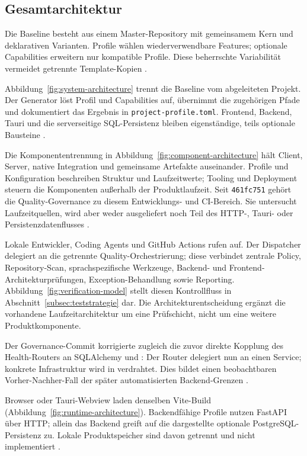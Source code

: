 \subsection{Gesamtarchitektur}
\label{subsec:gesamtarchitektur}

Die Baseline besteht aus einem Master-Repository mit gemeinsamem Kern und
deklarativen Varianten. Profile wählen wiederverwendbare Features; optionale
Capabilities erweitern nur kompatible Profile. Diese beherrschte Variabilität
vermeidet getrennte Template-Kopien
\parencite{clements2001software-product-lines,kleiveist2026profiles}.



Abbildung~\ref{fig:system-architecture} trennt die Baseline vom abgeleiteten
Projekt. Der Generator löst Profil und Capabilities auf, übernimmt die
zugehörigen Pfade und dokumentiert das Ergebnis in
\texttt{project-profile.toml}. Frontend, Backend, Tauri und die serverseitige
SQL-Persistenz bleiben eigenständige, teils optionale Bausteine
\parencite{kleiveist2026architecture,kleiveist2026persistence}.



Die Komponententrennung in Abbildung~\ref{fig:component-architecture} hält
Client, Server, native Integration und gemeinsame Artefakte auseinander.
Profile und Konfiguration beschreiben Struktur und Laufzeitwerte; Tooling und
Deployment steuern die Komponenten außerhalb der Produktlaufzeit. Seit
\texttt{461fc751} gehört die Quality-Governance zu diesem Entwicklungs- und
CI-Bereich. Sie untersucht Laufzeitquellen, wird aber weder ausgeliefert noch
Teil des HTTP-, Tauri- oder Persistenzdatenflusses
\parencite{kleiveist2026governance-snapshot}.

Lokale Entwickler, Coding Agents und GitHub Actions rufen
 auf. Der Dispatcher delegiert an die getrennte
Quality-Orchestrierung; diese verbindet zentrale Policy, Repository-Scan,
sprachspezifische Werkzeuge, Backend- und Frontend-Architekturprüfungen,
Exception-Behandlung sowie Reporting. Abbildung~\ref{fig:verification-model}
stellt diesen Kontrollfluss in Abschnitt~\ref{subsec:teststrategie} dar. Die
Architekturentscheidung ergänzt die vorhandene Laufzeitarchitektur um eine
Prüfschicht, nicht um eine weitere Produktkomponente.

Der Governance-Commit korrigierte zugleich die zuvor direkte Kopplung des
Health-Routers an SQLAlchemy und : Der Router delegiert nun an
einen Service; konkrete Infrastruktur wird in 
verdrahtet. Dies bildet einen beobachtbaren Vorher-Nachher-Fall der später
automatisierten Backend-Grenzen \parencite{kleiveist2026governance-commit}.



Browser oder Tauri-Webview laden denselben Vite-Build
(Abbildung~\ref{fig:runtime-architecture}). Backendfähige Profile nutzen
FastAPI über HTTP; allein das Backend greift auf die dargestellte optionale
PostgreSQL-Persistenz zu. Lokale Produktspeicher sind davon getrennt und nicht
implementiert \parencite{kleiveist2026persistence}.
